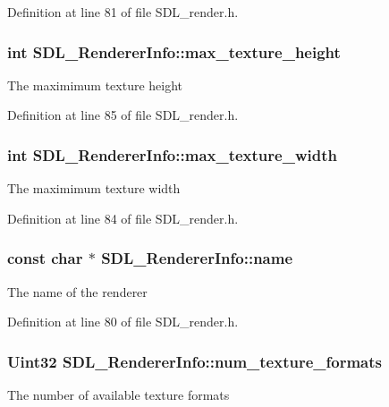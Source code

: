 Definition at line 81 of file S\+D\+L\+\_\+render.\+h.

\hypertarget{structSDL__RendererInfo_a87c6a13e8d535c2148f8913c05e13102}{
\subsubsection[{max\+\_\+texture\+\_\+height}]{\setlength{\rightskip}{0pt plus 5cm}int S\+D\+L\+\_\+\+Renderer\+Info\+::max\+\_\+texture\+\_\+height}}\label{structSDL__RendererInfo_a87c6a13e8d535c2148f8913c05e13102}
The maximimum texture height 

Definition at line 85 of file S\+D\+L\+\_\+render.\+h.

\hypertarget{structSDL__RendererInfo_a6e6757e3d5c1f0922adaba39380edfa6}{
\subsubsection[{max\+\_\+texture\+\_\+width}]{\setlength{\rightskip}{0pt plus 5cm}int S\+D\+L\+\_\+\+Renderer\+Info\+::max\+\_\+texture\+\_\+width}}\label{structSDL__RendererInfo_a6e6757e3d5c1f0922adaba39380edfa6}
The maximimum texture width 

Definition at line 84 of file S\+D\+L\+\_\+render.\+h.

\hypertarget{structSDL__RendererInfo_a7b37ff58e8310328cc16e3218c56dc4e}{
\subsubsection[{name}]{\setlength{\rightskip}{0pt plus 5cm}const char $\ast$ S\+D\+L\+\_\+\+Renderer\+Info\+::name}}\label{structSDL__RendererInfo_a7b37ff58e8310328cc16e3218c56dc4e}
The name of the renderer 

Definition at line 80 of file S\+D\+L\+\_\+render.\+h.

\hypertarget{structSDL__RendererInfo_acdec165b2053b914313f5996983ec6b8}{
\subsubsection[{num\+\_\+texture\+\_\+formats}]{\setlength{\rightskip}{0pt plus 5cm}Uint32 S\+D\+L\+\_\+\+Renderer\+Info\+::num\+\_\+texture\+\_\+formats}}\label{structSDL__RendererInfo_acdec165b2053b914313f5996983ec6b8}
The number of available texture formats 

